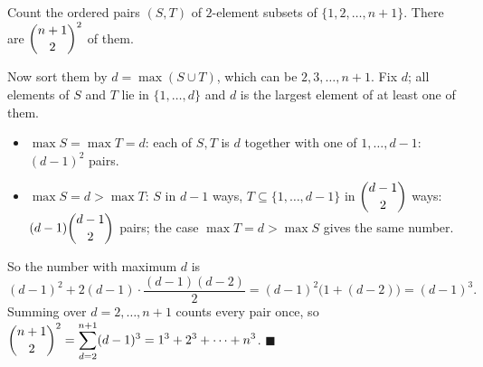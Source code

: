 Count the ordered pairs $(S,T)$ of $2$-element subsets of $\{1,2,\dots,n+1\}$. There are $\dbinom{n+1}{2}^2$ of them.

Now sort them by $d=\max(S\cup T)$, which can be $2,3,\dots,n+1$. Fix $d$; all elements of $S$ and $T$ lie in $\{1,\dots,d\}$ and $d$ is the largest element of at least one of them.
\begin{itemize}
\item $\max S=\max T=d$: each of $S,T$ is $d$ together with one of $1,\dots,d-1$: $(d-1)^2$ pairs.
\item $\max S=d>\max T$: $S$ in $d-1$ ways, $T\subseteq\{1,\dots,d-1\}$ in $\dbinom{d-1}{2}$ ways: $(d-1)\dbinom{d-1}2$ pairs; the case $\max T=d>\max S$ gives the same number.
\end{itemize}
So the number with maximum $d$ is
\[
(d-1)^2+2(d-1)\cdot\dfrac{(d-1)(d-2)}{2}=(d-1)^2\bigl(1+(d-2)\bigr)=(d-1)^3 .
\]
Summing over $d=2,\dots,n+1$ counts every pair once, so $\dbinom{n+1}{2}^2=\displaystyle\sum_{d=2}^{n+1}(d-1)^3=1^3+2^3+\cdots+n^3$. $\blacksquare$
